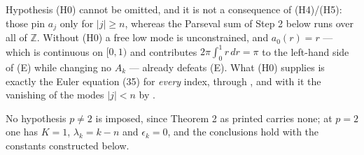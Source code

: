 \begin{lemma}
Hypothesis (H0) cannot be omitted, and it is not a consequence of (H4)/(H5):
those pin $a_j$ only for $|j|\ge n$, whereas the Parseval sum of Step 2 below
runs over all of $\mathbb{Z}$.  Without (H0) a free low mode is unconstrained,
and $a_0(r)=r$ --- which is continuous on $[0,1)$ and contributes
$2\pi\int_0^1 r\,dr=\pi$ to the left-hand side of (E) while changing no
$A_k$ --- already defeats (E).  What (H0) supplies is exactly the Euler
equation (35) for \emph{every} index, through , and
with it the vanishing of the modes $|j|<n$ by .

No hypothesis $p\neq2$ is imposed, since Theorem 2 as printed carries none;
at $p=2$ one has $K=1$, $\lambda_k=k-n$ and $\epsilon_k=0$, and the
conclusions hold with the constants constructed below.
\end{lemma}
